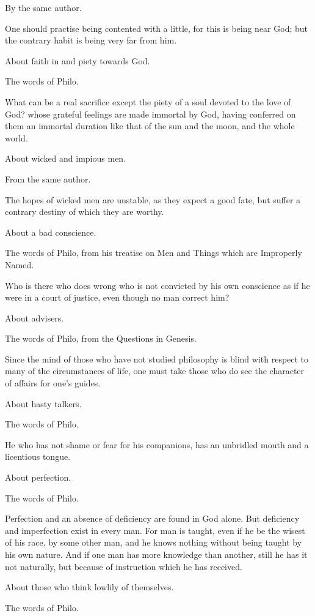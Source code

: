 By the same author.

One should practise being contented with a little, for this is being near God; but the contrary habit is
being very far from him.

About faith in and piety towards God.

The words of Philo.

What can be a real sacrifice except the piety of a soul devoted to the love of God? whose grateful
feelings are made immortal by God, having conferred on them an immortal duration like that of the
sun and the moon, and the whole world.

About wicked and impious men.

From the same author.

The hopes of wicked men are unstable, as they expect a good fate, but suffer a contrary destiny of
which they are worthy.

About a bad conscience.

The words of Philo, from his treatise on Men and Things which are Improperly Named.

Who is there who does wrong who is not convicted by his own conscience as if he were in a court
of justice, even though no man correct him?

About advisers.

The words of Philo, from the Questions in Genesis.

Since the mind of those who have not studied philosophy is blind with respect to many of the
circumstances of life, one must take those who do see the character of affairs for one's guides.

About hasty talkers.

The words of Philo.

He who has not shame or fear for his companions, has an unbridled mouth and a licentious
tongue.

About perfection.

The words of Philo.

Perfection and an absence of deficiency are found in God alone. But deficiency and imperfection
exist in every man. For man is taught, even if he be the wisest of his race, by some other man, and
he knows nothing without being taught by his own nature. And if one man has more knowledge than
another, still he has it not naturally, but because of instruction which he has received.

About those who think lowlily of themselves.

The words of Philo.

